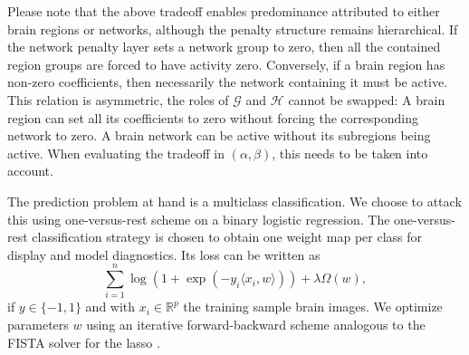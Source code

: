 \documentclass[runningheads,a4paper]{llncs}
\begin{document}
Please note that the above tradeoff enables predominance
attributed to either brain regions or networks, although the
penalty structure remains hierarchical.
If the network penalty layer sets a
network group to zero, then all the contained region groups are forced to
have activity zero. Conversely, if a brain region has non-zero coefficients,
then necessarily the network containing it must be active.
This relation is asymmetric, the roles of \(\mathcal G\) and \(\mathcal H\) 
cannot be swapped: A brain 
region can set all its coefficients to zero without forcing the 
corresponding network to zero. A brain network can be active without its
subregions being active.
When evaluating the tradeoff in \((\alpha, \beta)\), this needs to be taken
into account.

The prediction problem at hand is a multiclass classification. We choose to
attack this using one-versus-rest scheme on a binary logistic regression.
The one-versus-rest classification strategy is
chosen to obtain one weight map per class for display and model diagnostics.
Its loss can be written as
\[\sum_{i=1}^n\log(1 + \exp(-y_i\langle x_i, w\rangle)) + \lambda\Omega(w),\]
if \(y\in\{-1, 1\}\) and with \(x_i\in\mathbb{R}^p\) the training sample brain images.
We optimize parameters \(w\) using an iterative forward-backward
scheme analogous to the FISTA solver for the lasso \cite{beck2009}.
\end{document}
